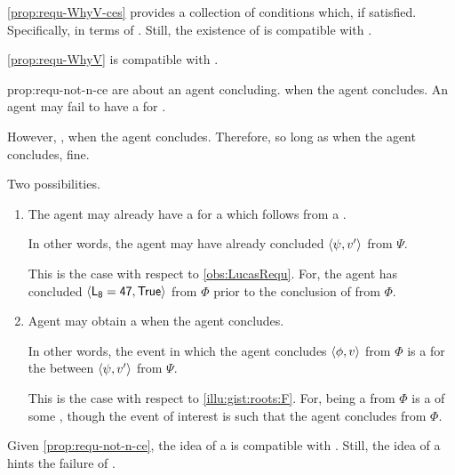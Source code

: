 \begin{note}
  \autoref{prop:requ-WhyV-ces} provides a collection of conditions which, if satisfied.
  Specifically, in terms of .
  Still, the existence of  is compatible with \issueConstraint{}.

  \begin{observation}%
    \label{prop:requ-not-n-ce}%
    \autoref{prop:requ-WhyV} is compatible with \issueConstraint{}.
  \end{observation}

  \begin{motivation}{prop:requ-not-n-ce}
     are about an agent concluding.
    \fc{} when the agent concludes.
    An agent may fail to have a \wit{} for \fc{}.

    However, \issueConstraint{}, \wit{} when the agent concludes.
    Therefore, so long as \wit{} when the agent concludes, fine.

    Two possibilities.
    \begin{enumerate}
    \item
      The agent may already have a \wit{} for a \ros{} which follows from a \fc{}.

      In other words, the agent may have already concluded \(\langle \psi, v' \rangle\) from \(\Psi\).

      This is the case with respect to \autoref{obs:LucasRequ}.
      For, the agent has concluded \(\pv{\propM{L_{8} = 47}}{\valI{True}}\) from \(\Phi\) prior to the \agents{} conclusion of  from \(\Phi\).
    \item
      Agent may obtain a \wit{} when the agent concludes.

      In other words, the event in which the agent concludes \(\langle \phi, v \rangle\) from \(\Phi\) is a \wit{} for the \ros{} between \(\langle \psi, v' \rangle\) from \(\Psi\).

      This is the case with respect to \autoref{illu:gist:roots:F}.
      For,  being a \fc{} from \(\Phi\) is a \requ{} of some \se{}, though the event of interest is such that the agent concludes  from \(\Phi\).
    \end{enumerate}
    \vspace{-\baselineskip}
  \end{motivation}
\end{note}


\begin{note}
  Given \autoref{prop:requ-not-n-ce}, the idea of a \requ{} is compatible with \issueInclusion{}.
  Still, the idea of a  hints the failure of \issueConstraint{}.
\end{note}


